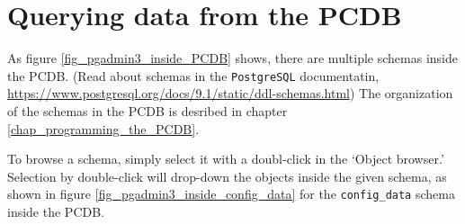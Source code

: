 \section{Querying data from the PCDB}\label{sec_query_from_the_PCDB}

As figure \ref{fig_pgadmin3_inside_PCDB} shows, there are multiple schemas inside the PCDB. (Read about schemas in the \texttt{PostgreSQL} documentatin, \url{https://www.postgresql.org/docs/9.1/static/ddl-schemas.html})
The organization of the schemas in the PCDB is desribed in chapter \ref{chap_programming_the_PCDB}.

To browse a schema, simply select it with a doubl-click in the `Object browser.'
Selection by double-click will drop-down the objects inside the given schema, as shown in figure \ref{fig_pgadmin3_inside_config_data} for the \texttt{config\_data} schema inside the PCDB.

